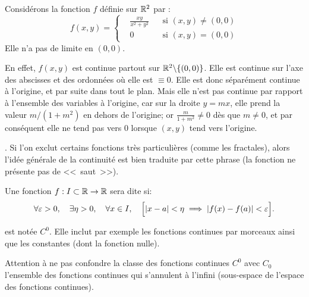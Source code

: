 \ifVersionDuDocEstVincent\medskip\fi
Considérons la fonction $f$ définie sur $\mathbb R^2$ par :
\begin{equation}
    f(x,y)=\left\{\begin{aligned}&\frac{xy}{x^2+y^2}&&\text{si $(x,y)\neq(0,0)$} \\
&0&&\text{si $(x,y)=(0,0)$} \end{aligned}\right.
\end{equation}
Elle n'a pas de limite en $(0,0)$.

\small
En effet, $f(x,y)$ est continue partout sur $\mathbb R^2\backslash\{(0,0)\}$.
Elle est continue sur l'axe des abscisses et des ordonnées où elle est $\equiv0$.
Elle est donc séparément continue à l'origine, et par suite dans tout le plan.
Mais elle n'est pas continue par rapport à l'ensemble des variables à l'origine,
car sur la droite $y=mx$, elle prend la valeur $m/(1+m^2)$ en dehors de
l'origine; or $\frac{m}{1+m^2}\ne0$ dès que $m\ne0$, et par conséquent elle
ne tend pas vers $0$ lorsque $(x,y)$ tend vers l'origine.
\normalsize

\ifVersionDuDocEstVincent\medskip\fi
{}.
Si l'on exclut certains fonctions très particulières (comme les fractales), alors l'idée générale
de la continuité est bien traduite par cette phrase (la fonction ne présente pas de <<~saut~>>).

\ifVersionDuDocEstVincent\medskip\fi
\begin{definition}
Une fonction $f : I\subset\mathbb R  \to \mathbb R$ sera dite  si:
\begin{equation}
    \forall \varepsilon > 0, \quad \exists \eta > 0, \quad \forall x \in I, \quad \Bigl[|x - a| <\eta \implies |f(x) - f(a)|<\varepsilon\Bigr].
\end{equation}
\end{definition}

\ifVersionDuDocEstVincent\medskip\fi
{} est notée $C^0$.
Elle inclut par exemple les fonctions continues par morceaux ainsi que les constantes (dont
la fonction nulle).

\ifVersionDuDocEstVincent\medskip\fi
Attention à ne pas confondre la classe des fonctions continues $C^0$ avec
$C_0$ l'ensemble des fonctions continues qui s'annulent à l'infini (sous-espace de l'espace
des fonctions continues).

